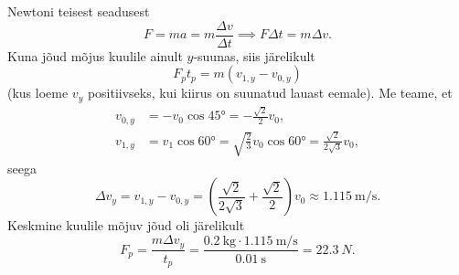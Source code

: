 \osa Newtoni teisest seadusest
\begin{equation*}
    F = ma = m\frac{\Delta v}{\Delta t} \implies F\Delta t = m\Delta v.
\end{equation*}
Kuna jõud mõjus kuulile ainult $y$-suunas, siis järelikult
\begin{equation*}
    F_p t_p = m\left(v_{1,y}-v_{0,y}\right)
\end{equation*}
(kus loeme $v_y$ positiivseks, kui kiirus on suunatud lauast eemale). Me teame, et
\begin{align*}
    v_{0,y} &= -v_0 \cos\ang{45} = -\frac{\sqrt 2}{2}v_0,\\
    v_{1,y} &= v_1 \cos\ang{60} = \sqrt{\frac{2}{3}}v_0\cos\ang{60} = \frac{\sqrt 2}{2\sqrt 3}v_0,
\end{align*}
seega
\begin{equation*}
    \Delta v_y = v_{1,y}-v_{0,y} = \left(\frac{\sqrt 2}{2\sqrt 3} + \frac{\sqrt 2}{2}\right)v_0 \approx \SI{1.115}{\m\per\s}.
\end{equation*}
Keskmine kuulile mõjuv jõud oli järelikult
\begin{equation*}
    F_p = \frac{m\Delta v_y}{t_p} = \frac{\SI{0.2}{\kg}\cdot \SI{1.115}{\m\per\s}}{\SI{0.01}{\s}} = \SI{22.3}{N}.
\end{equation*}
\probend